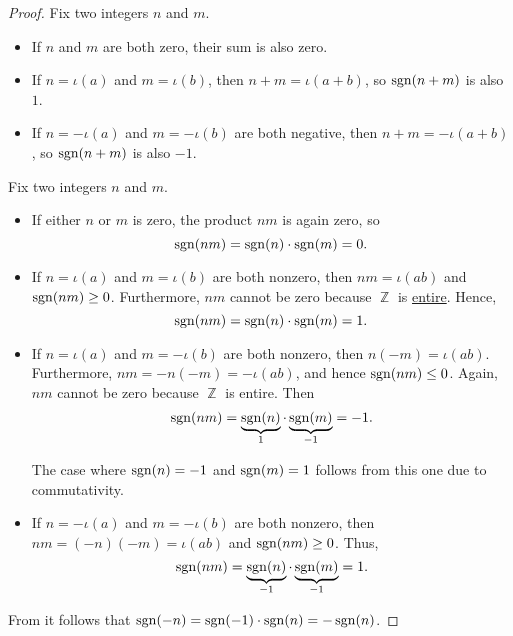 \begin{proof}
   Fix two integers \( n \) and \( m \).

  \begin{itemize}
    \item If \( n \) and \( m \) are both zero, their sum is also zero.
    \item If \( n = \iota(a) \) and \( m = \iota(b) \), then \( n + m = \iota(a + b) \), so \( \operatorname{sgn}(n + m) \) is also \( 1 \).
    \item If \( n = -\iota(a) \) and \( m = -\iota(b) \) are both negative, then \( n + m = -\iota(a + b) \), so \( \operatorname{sgn}(n + m) \) is also \( -1 \).
  \end{itemize}

   Fix two integers \( n \) and \( m \).

  \begin{itemize}
    \item If either \( n \) or \( m \) is zero, the product \( nm \) is again zero, so
    \begin{equation*}
      \operatorname{sgn}(nm) = \operatorname{sgn}(n) \cdot \operatorname{sgn}(m) = 0.
    \end{equation*}

    \item If \( n = \iota(a) \) and \( m = \iota(b) \) are both nonzero, then \( nm = \iota(ab) \) and \( \operatorname{sgn}(nm) \geq 0 \). Furthermore, \( nm \) cannot be zero because \( \BbbZ \) is \hyperref[def:entire_semiring]{entire}. Hence,
    \begin{equation*}
      \operatorname{sgn}(nm) = \operatorname{sgn}(n) \cdot \operatorname{sgn}(m) = 1.
    \end{equation*}

    \item If \( n = \iota(a) \) and \( m = -\iota(b) \) are both nonzero, then \( n(-m) = \iota(ab) \). Furthermore, \( nm = -n(-m) = -\iota(ab) \), and hence \( \operatorname{sgn}(nm) \leq 0 \). Again, \( nm \) cannot be zero because \( \BbbZ \) is entire. Then
    \begin{equation*}
      \operatorname{sgn}(nm) = \underbrace{\operatorname{sgn}(n)}_1 \cdot \underbrace{\operatorname{sgn}(m)}_{-1} = -1.
    \end{equation*}

    The case where \( \operatorname{sgn}(n) = -1 \) and \( \operatorname{sgn}(m) = 1 \) follows from this one due to commutativity.

    \item If \( n = -\iota(a) \) and \( m = -\iota(b) \) are both nonzero, then \( nm = (-n)(-m) = \iota(ab) \) and \( \operatorname{sgn}(nm) \geq 0 \). Thus,
    \begin{equation*}
      \operatorname{sgn}(nm) = \underbrace{\operatorname{sgn}(n)}_{-1} \cdot \underbrace{\operatorname{sgn}(m)}_{-1} = 1.
    \end{equation*}
  \end{itemize}

   From  it follows that \( \operatorname{sgn}(-n) = \operatorname{sgn}(-1) \cdot \operatorname{sgn}(n) = -\operatorname{sgn}(n) \).
\end{proof}

